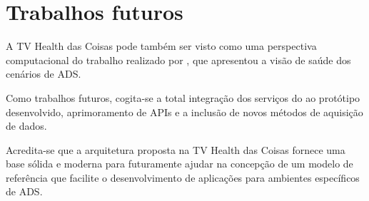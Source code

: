 \section{Trabalhos futuros} \label{sec:trabalhos-futuros}

A TV Health das Coisas pode também ser visto como uma perspectiva computacional do
trabalho realizado por \citeauthor{santos2014}, que apresentou a visão de saúde
dos cenários de ADS. 

Como trabalhos futuros, cogita-se a total integração dos serviços do \nextsaude[]
ao protótipo desenvolvido, aprimoramento de APIs e a inclusão de novos métodos de 
aquisição de dados.

Acredita-se que a arquitetura proposta na TV Health das Coisas fornece uma base
sólida e moderna para futuramente ajudar na concepção de um modelo de
referência que facilite o desenvolvimento de aplicações para ambientes
específicos de ADS. 

